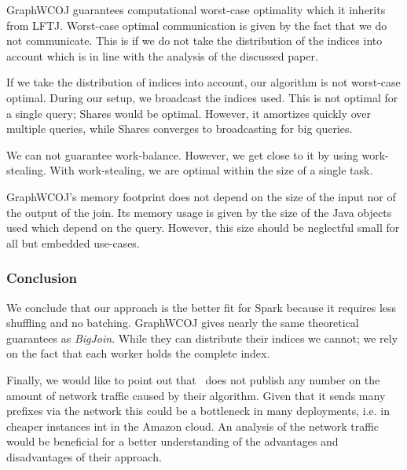 GraphWCOJ guarantees computational worst-case optimality which it inherits from \textsc{LFTJ}.
Worst-case optimal communication is given by the fact that we do not communicate.
This is if we do not take the distribution of the indices into account which is in line with the analysis of the discussed paper.

If we take the distribution of indices into account, our algorithm is not worst-case optimal.
During our setup, we broadcast the indices used.
This is not optimal for a single query;
Shares would be optimal.
However, it amortizes quickly over multiple queries, while Shares converges to broadcasting for big queries.

We can not guarantee work-balance.
However, we get close to it by using work-stealing.
With work-stealing, we are optimal within the size of a single task.

GraphWCOJ's memory footprint does not depend on the size of the input nor of the output of the join.
Its memory usage is given by the size of the Java objects used which depend on the query.
However, this size should be neglectful small for all but embedded use-cases.

\subsubsection{Conclusion}
We conclude that our approach is the better fit for Spark because it requires less shuffling and no batching.
GraphWCOJ gives nearly the same theoretical guarantees as \textit{BigJoin}.
While they can distribute their indices we cannot;
we rely on the fact that each worker holds the complete index.

Finally, we would like to point out that~\cite{ammar2018distributed} does not publish any number on the amount
of network traffic caused by their algorithm.
Given that it sends many prefixes via the network this could be a bottleneck in many deployments, i.e. in cheaper instances
int in the Amazon cloud.
An analysis of the network traffic would be beneficial for a better understanding of the advantages and disadvantages
of their approach.



